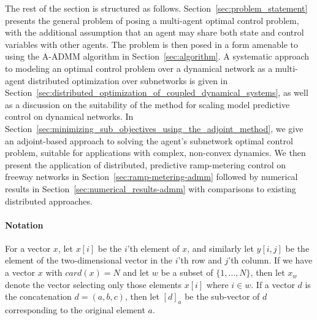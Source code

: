 The rest of the section is structured as follows.
Section~\ref{sec:problem_statement} presents the general problem of posing a multi-agent optimal control problem, with the additional assumption that an agent may share both state and control variables with other agents. The problem is then posed in a form amenable to using the A-ADMM algorithm in Section~\ref{sec:algorithm}. A systematic approach to modeling an optimal control problem over a dynamical network as a multi-agent distributed optimization over subnetworks is given in Section~\ref{sec:distributed_optimization_of_coupled_dynamical_systems}, as well as a discussion on the suitability of the method for scaling model predictive control on dynamical networks. In Section~\ref{sec:minimizing_sub_objectives_using_the_adjoint_method}, we give an adjoint-based approach to solving the agent's subnetwork optimal control problem, suitable for applications with complex, non-convex dynamics. We then present the application of distributed, predictive ramp-metering control on freeway networks in Section~\ref{sec:ramp-metering-admm} followed by numerical results in Section~\ref{sec:numerical_results-admm} with comparisons to existing distributed approaches.

\paragraph*{\textbf{Notation}}

For a vector $x$, let $x\left[i\right]$ be the $i$'th element of $x$, and similarly let $y\left[i,j\right]$ be the element of the two-dimensional vector in the $i$'th row and $j$'th column. If we have a vector $x$ with $card\left(x\right)=N$ and let $w$ be a subset of $ \{1,\ldots,N\}$, then let $x_w$ denote the vector selecting only those elements $x\left[i\right]$ where $i\in w$. If a vector $d$ is the concatenation $d = \left(a,b,c\right)$, then let $\left[d\right]_a$ be the sub-vector of $d$ corresponding to the original element $a$.



